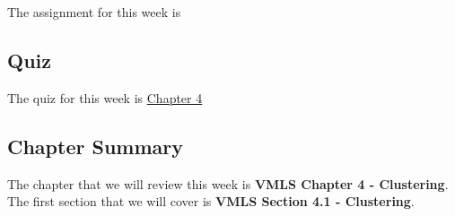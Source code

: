The assignment for this week is   

\subsection{Quiz}

The quiz for this week is \href{https://applied.cs.colorado.edu/mod/quiz/view.php?id=50706}{Chapter 4} \textbullet {}  

\subsection{Chapter Summary}

The chapter that we will review this week is \textbf{VMLS Chapter 4 - Clustering}. The first section that we will cover is \textbf{VMLS Section 4.1 - Clustering}.

